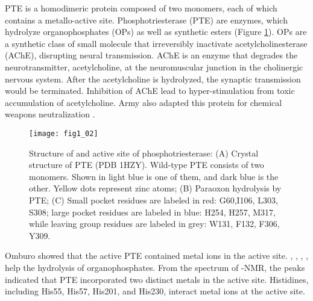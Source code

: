 \begin{refsection}
PTE is a homodimeric protein composed of two monomers, each of which contains a
metallo-active site. Phosphotriesterase (PTE) are enzymes, which hydrolyze
organophosphates (OPs) as well as synthetic esters (Figure
\ref{fig:pte-structure})\cite{Ghanem2005a}. OPs are a synthetic class of small
molecule that irreversibly inactivate acetylcholinesterase (AChE), disrupting
neural transmission. AChE is an enzyme that degrades the neurotransmitter,
acetylcholine, at the neuromuscular junction in the cholinergic nervous system.
After the acetylcholine is hydrolyzed, the synaptic transmission would be
terminated. Inhibition of AChE lead to hyper-stimulation from toxic
accumulation of acetylcholine\cite{Soreq2001}. Army also adapted this protein
for chemical weapons neutralization \cite{Yang2014a}.
\begin{figure}[h!] \centering \texttt{[image: fig1\_02]}
    \caption[Structure of and active site of phosphotriesterase: (A) Crystal
    structure of PTE (PDB 1HZY). Wild-type PTE consists of two monomers. Shown
in light blue is one of them, and dark blue is the other. Yellow dots represent
zinc atoms; (B) Paraoxon hydrolysis by PTE; (C) Small pocket residues are
labeled in red: G60,I106, L303, S308; large pocket residues are labeled in
blue: H254, H257, M317, while leaving group residues are labeled in grey: W131,
F132, F306, Y309.] {Structure of and active site of phosphotriesterase: (A)
Crystal structure of PTE (PDB 1HZY). Wild-type PTE consists of two monomers.
Shown in light blue is one of them, and dark blue is the other. Yellow dots
represent zinc atoms; (B) Paraoxon hydrolysis by PTE;  (C) Small pocket
residues are labeled in red: G60,I106, L303, S308; large pocket residues are
labeled in blue: H254, H257, M317, while leaving group residues are labeled in
grey: W131, F132, F306, Y309.}
\label{fig:pte-structure} 
\end{figure} 

Omburo  showed that the active PTE contained metal ions in the
active site. , , , ,
 help the hydrolysis of organophosphates\cite{Omburo1992a}. From
the spectrum of -NMR, the peaks indicated that PTE incorporated
two distinct metals in the active site\cite{Omburo1993}. Histidines, including
His55, His57, His201, and His230, interact metal ions at the active
site\cite{Benning2001a}. 


\end{refsection}
